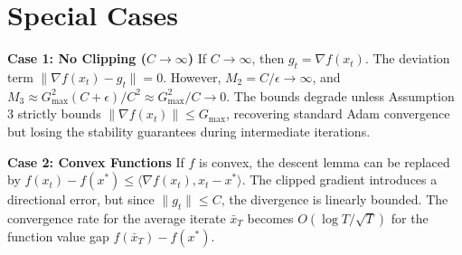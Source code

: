 \documentclass{article}
\begin{document}
\section*{Special Cases}

\textbf{Case 1: No Clipping ($C \to \infty$)}
If $C \to \infty$, then $g_t = \nabla f(x_t)$. The deviation term $\|\nabla f(x_t) - g_t\| = 0$. However, $M_2 = C/\epsilon \to \infty$, and $M_3 \approx G_{\max}^2 (C+\epsilon)/C^2 \approx G_{\max}^2/C \to 0$. The bounds degrade unless Assumption 3 strictly bounds $\|\nabla f(x_t)\| \leq G_{\max}$, recovering standard Adam convergence but losing the stability guarantees during intermediate iterations.

\textbf{Case 2: Convex Functions}
If $f$ is convex, the descent lemma can be replaced by $f(x_t) - f(x^*) \leq \langle \nabla f(x_t), x_t - x^* \rangle$. The clipped gradient introduces a directional error, but since $\|g_t\| \leq C$, the divergence is linearly bounded. The convergence rate for the average iterate $\bar{x}_T$ becomes $O(\log T / \sqrt{T})$ for the function value gap $f(\bar{x}_T) - f(x^*)$.
\end{document}

